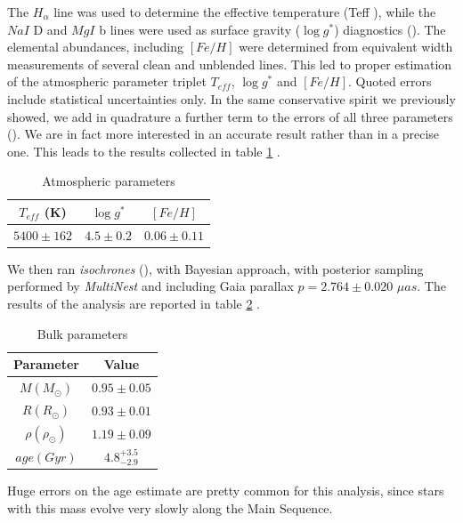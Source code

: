 \documentclass[a4paper,11pt,twocolumn]{article}
\begin{document}
The $H_{\alpha}$ line was used to determine the effective temperature (Teff ),
while the $NaI$ D and $MgI$ b lines were used as surface gravity
($\log{g^*}$) diagnostics (\cite{Anderson}). The elemental abundances, including $[Fe/H]$ 
were determined from equivalent width measurements of several clean and 
unblended lines. This led to proper estimation of the atmospheric parameter 
triplet $T_{eff}$, $\log{g^*}$ and $[Fe/H]$. Quoted errors include statistical 
uncertainties only. In the same conservative spirit we 
previously showed, we add in quadrature a further term to the errors of 
all three parameters (\cite{Sousa}). We are in fact more interested in an 
accurate result rather than in a precise one.
This leads to the results collected in table \ref{table:a} .
\begin{table}[h!]
\centering
    \begin{tabular}{ccc}
    \hline
    $T_{eff}$ (K) & $\log{g^*}$ & $[Fe/H]$ \\
    \hline
    $5400 \pm 162$ & $4.5 \pm 0.2$ & $0.06 \pm 0.11$ \\
    \hline
    \end{tabular}
     \caption{Atmospheric parameters}
\label{table:a}
\end{table}
We then ran \textit{isochrones} (\cite{Morton}), with Bayesian approach, 
with posterior sampling performed by \textit{MultiNest} and including Gaia 
parallax $p=2.764 \pm 0.020$ $\mu as$. The results of the 
analysis are reported in table \ref{table:b} .
\begin{table}[h!]
\centering
    \begin{tabular}{cc}
    \hline
    Parameter & Value \\
    \hline
     $M (M_{\odot})$ &  $0.95\pm0.05$ \\
     $R (R_{\odot})$ & $0.93 \pm 0.01$  \\
     $\rho (\rho_{\odot})$ & $1.19 \pm 0.09$ \\
     $age (Gyr)$  & $4.8^{+3.5}_{-2.9}$ \\
    \hline
    \end{tabular}
\caption{Bulk parameters}
\label{table:b}
\end{table}
Huge errors on the age estimate are pretty common for this analysis, since 
stars with this mass evolve very slowly along the Main Sequence.

\end{document}
